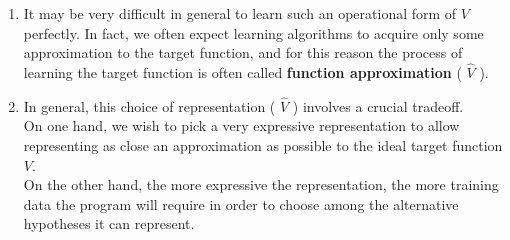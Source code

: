 \begin{enumerate}[itemsep=0.2cm]
    \item It may be very difficult in general to learn such an operational form of $V$ perfectly. In fact, we often expect learning algorithms to acquire only some approximation to the target function, and for this reason the process of learning the target function is often called \textbf{function approximation} ( $\hat{V}$ ).
    \hfill \cite{ml/book/Machine-Learning/Tom-M-Mitchell}

    \item In general, this choice of representation ( $\hat{V}$ ) involves a crucial tradeoff.
    \\
    On one hand, we wish to pick a very expressive representation to allow representing as close an approximation as possible to the ideal target function $V$.
    \\
    On the other hand, the more expressive the representation, the more training data the program will require in order to choose among the alternative hypotheses it can represent.
    \hfill \cite{ml/book/Machine-Learning/Tom-M-Mitchell}




\end{enumerate}
